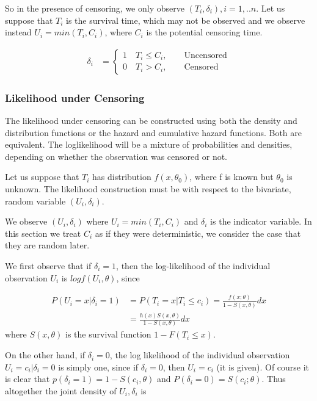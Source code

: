 \documentclass[11pt]{article} %
\begin{document}
So in the presence of censoring, we only observe $(T_i, \delta_i), i=1,..n$. Let us suppose that $T_i$ is the survival time, which may not be observed and we observe instead $U_i = min(T_i, C_i)$, where $C_i$ is the potential censoring time. 

\begin{align*}
	\delta_i & =
	\begin{cases}
		1 \quad T_i \leq C_i, \qquad \text{Uncensored}\\
		0 \quad  T_i > C_i, \qquad \text{Censored}
	\end{cases}
\end{align*}

\subsubsection{Likelihood under Censoring}
The likelihood under censoring can be constructed using both the density and distribution
functions or the hazard and cumulative hazard functions. Both are equivalent. The loglikelihood will be a mixture of probabilities and densities, depending on whether the
observation was censored or not. 

Let us suppose that $T_i$ has distribution $f(x, \theta_0)$, where f is known but $\theta_0$ is unknown. The likelihood construction must be with respect to the bivariate, random variable $(U_i, \delta_i)$.

We observe $(U_i, \delta_i)$ where $U_i = min(T_i, C_i)$ and $\delta_i$ is the
indicator variable. In this section we treat $C_i$ as if they were deterministic, we consider
the case that they are random later.

We first observe that if $\delta_i = 1$, then the log-likelihood of the individual observation $U_i$ is $log f(U_i, \theta)$, since

\begin{align*}
	P(U_i= x| \delta_i=1) & = P(T_i= x| T_i \leq c_i) = \frac{f(x; \theta)}{ 1- S(x, \theta)} dx\\
	& = \frac{h(x) S(x,\theta)}{1- S(x, \theta)} dx
\end{align*}
where $S(x, \theta)$ is the survival function $1- F(T_i \leq x)$.

On the other hand, if $\delta_i = 0$, the log likelihood of the individual observation $U_i = c_i|\delta_i = 0$ is simply one, since if $\delta_i = 0$, then $U_i = c_i$ (it is given). Of course it is clear that $p(\delta_i= 1) = 1 - S(c_i, \theta)$ and $P(\delta_i = 0) = S(c_i; \theta)$. Thus altogether the joint density of ${U_i, \delta_i}$ is
\end{document}
